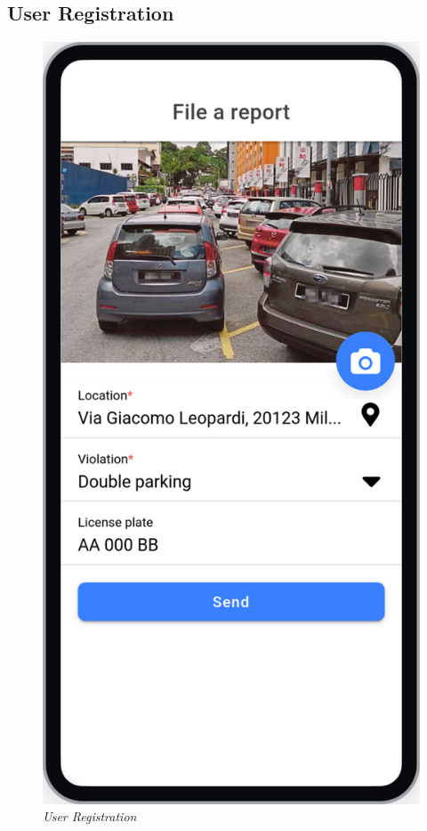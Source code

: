 \subsection{User Registration}
\begin{figure}[H]
  \centering
  \includegraphics[origin=c,width=\textwidth,height=.90\textheight,keepaspectratio]{DD_Images/UserInterface/Report.jpg}
  \caption{\textit{User Registration}}
\end{figure}